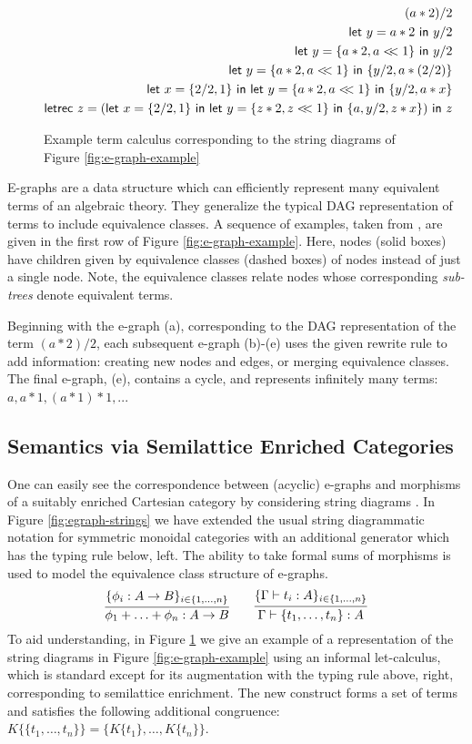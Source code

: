 \begin{figure}\label{fig:let-calculus}
\begin{align*}
    (a*2)/2 \\
    \mylet{y}{a*2} y/2 \\ 
    \mylet{y}{\{a*2,a<\!\!<1\}} y/2 \\
    \mylet{y}{\{a*2,a<\!\!<1\}} \{y/2, a*(2/2)\} \\
    \mylet{x}{\{2/2, 1\}} \mylet{y}{\{a*2, a <\!\!< 1\}} \{y/2, a*x\} \\
    \textsf{letrec } z = (\mylet{x}{\{2/2, 1\}} \mylet{y}{\{z*2, z <\!\!< 1\}} \{a, y/2, z*x\}) \textsf{ in } z
\end{align*}
\caption{Example term calculus corresponding to the string diagrams of Figure \ref{fig:e-graph-example}}
\end{figure}

E-graphs are a data structure which can efficiently represent many equivalent terms of an algebraic theory. They generalize the typical DAG representation of terms to include equivalence classes. 
A sequence of examples, taken from \cite{EggPaper}, are given in the first row of Figure \ref{fig:e-graph-example}. Here,  nodes (solid boxes) have children given by equivalence classes (dashed boxes) of nodes instead of just a single node.  Note, the equivalence classes relate nodes whose corresponding \textit{sub-trees} denote equivalent terms. 

Beginning with the e-graph (a), corresponding to the DAG representation of the term $(a*2)/2$, each subsequent e-graph (b)-(e) uses the given rewrite rule to add information: creating new nodes and edges, or merging equivalence classes. The final e-graph, (e), contains a cycle, and represents infinitely many terms: $a, a*1, (a*1)*1, $... 

\subsection*{Semantics via Semilattice Enriched Categories}

One can easily see the correspondence between (acyclic) e-graphs and morphisms of a suitably enriched Cartesian category by considering string diagrams 
\cite{noauthor_09083347_nodate,joyal_geometry_1991, mellies_functorial_2006}. In Figure \ref{fig:egraph-strings} we have extended the usual string diagrammatic notation for symmetric monoidal categories with an additional generator which has the  typing rule below, left.
The ability to take formal sums of morphisms is used to model the equivalence class structure of e-graphs.  
\[
\infer{\phi_1 + \ldots + \phi_n: A \to B}{\{\phi_i: A \to B\}_{i \in \{1,\ldots,n\}}}
\qquad
\infer{\Gamma \vdash \{t_1, \ldots, t_n\}: A}{\{\Gamma \vdash t_i: A\}_{i \in \{1, \ldots, n\}}}
\]
To aid understanding, in Figure \ref{fig:let-calculus} we give an example of a representation of the string diagrams in Figure \ref{fig:e-graph-example} using an informal let-calculus, which is standard except for its augmentation with the typing rule above, right, corresponding to semilattice enrichment. The new construct forms a set of terms and satisfies the following additional congruence: $K\{\{t_1, \ldots, t_n\}\} = \{K\{t_1\}, \ldots, K\{t_n\}\}$. 

